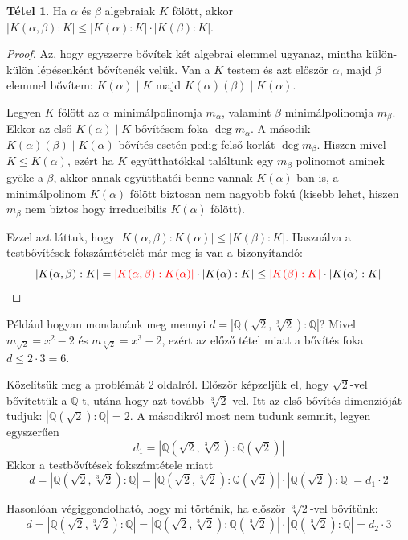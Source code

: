 \documentclass[12pt]{book}
\theoremstyle{plain} %
\theoremstyle{definition} %
\newtheorem{theo/}{Tétel}[section]
\newenvironment{theo}
  {\renewcommand{\qedsymbol}{$\clubsuit$}%
   \pushQED{\qed}\begin{theo/}}
  {\popQED\end{theo/}}
\theoremstyle{remark}
\renewcommand\qedsymbol{$\blacksquare$}
\numberwithin{equation}{section}  %
\begin{document}
	\begin{theo}\label{becsles}
		Ha $\alpha$ és $\beta$ algebraiak $K$ fölött, akkor $|K(\alpha,\beta):K|\leq |K(\alpha):K|\cdot |K(\beta):K|$.
	\end{theo}

	\begin{proof}
		Az, hogy egyszerre bővítek két algebrai elemmel ugyanaz, mintha külön-külön lépésenként bővítenék velük. Van a $K$ testem és azt először $\alpha$, majd $\beta$ elemmel bővítem: $K(\alpha)\mid K$ majd $K(\alpha)(\beta)\mid K(\alpha)$.
		
		Legyen $K$ fölött az $\alpha$ minimálpolinomja $m_\alpha$, valamint $\beta$ minimálpolinomja $m_\beta$. Ekkor az első $K(\alpha)\mid K$ bővítésem foka $\deg m_\alpha$. A második $K(\alpha)(\beta)\mid K(\alpha)$ bővítés esetén pedig felső korlát $\deg m_\beta$. Hiszen mivel $K \leq K(\alpha)$, ezért ha $K$ együtthatókkal találtunk egy $m_\beta$ polinomot aminek gyöke a $\beta$, akkor annak együtthatói benne vannak $K(\alpha)$-ban is, a minimálpolinom $K(\alpha)$ fölött biztosan nem nagyobb fokú (kisebb lehet, hiszen $m_\beta$ nem biztos hogy irreducibilis $K(\alpha)$ fölött).
		
		Ezzel azt láttuk, hogy $|K(\alpha,\beta):K(\alpha)|\leq |K(\beta):K|$. Használva a testbővítések fokszámtételét már meg is van a bizonyítandó:
		\[ |K(\alpha,\beta):K| = \color{red} |K(\alpha,\beta):K(\alpha)|\color{black} \cdot |K(\alpha):K| \leq \color{red} |K(\beta):K| \color{black} \cdot |K(\alpha):K| \]
	\end{proof}

	Például hogyan mondanánk meg mennyi $d=|\mathbb{Q}(\sqrt{2},\sqrt[3]{2}):\mathbb{Q}|$? Mivel $m_{\sqrt{2}} = x^2-2$ és $m_{\sqrt[3]{2}} =x^3-2$, ezért az előző tétel miatt a bővítés foka $d \leq 2\cdot 3 = 6$.
	
	Közelítsük meg a problémát 2 oldalról. Először képzeljük el, hogy $\sqrt{2}$-vel bővítettük a $\mathbb{Q}$-t, utána hogy azt tovább $\sqrt[3]{2}$-vel. Itt az első bővítés dimenzióját tudjuk: $|\mathbb{Q}(\sqrt{2}):\mathbb{Q}| = 2$. A másodikról most nem tudunk semmit, legyen egyszerűen
	\[d_1 = |\mathbb{Q}(\sqrt{2},\sqrt[3]{2}):\mathbb{Q}(\sqrt{2})| \]
	Ekkor a testbővítések fokszámtétele miatt
	\[ d =  |\mathbb{Q}(\sqrt{2},\sqrt[3]{2}):\mathbb{Q}| = |\mathbb{Q}(\sqrt{2},\sqrt[3]{2}):\mathbb{Q}(\sqrt{2})|\cdot |\mathbb{Q}(\sqrt{2}):\mathbb{Q}| = d_1 \cdot 2  \]

	Hasonlóan végiggondolható, hogy mi történik, ha először $\sqrt[3]{2}$-vel bővítünk:
	\[ d =  |\mathbb{Q}(\sqrt{2},\sqrt[3]{2}):\mathbb{Q}| = |\mathbb{Q}(\sqrt{2},\sqrt[3]{2}):\mathbb{Q}(\sqrt[3]{2})|\cdot |\mathbb{Q}(\sqrt[3]{2}):\mathbb{Q}| = d_2 \cdot 3  \]
	
\end{document}
